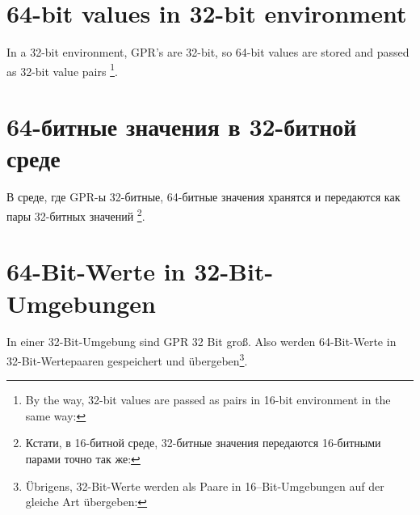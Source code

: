 \ifdefined\ENGLISH
\section{64-bit values in 32-bit environment}
\label{sec:64bit_in_32_env}

In a 32-bit environment, \ac{GPR}'s are 32-bit, so 64-bit values are stored and passed as 32-bit value pairs
\footnote{By the way, 32-bit values are passed as pairs in 16-bit environment in the same way: }.
\fi

\ifdefined\RUSSIAN
\section{64-битные значения в 32-битной среде}
\label{sec:64bit_in_32_env}

В среде, где \ac{GPR}-ы 32-битные, 64-битные значения хранятся и передаются как пары 32-битных значений
\footnote{Кстати, в 16-битной среде, 32-битные значения передаются 16-битными парами точно так же: }.
\fi

\ifdefined\GERMAN
\section{64-Bit-Werte in 32-Bit-Umgebungen}
\label{sec:64bit_in_32_env}

In einer 32-Bit-Umgebung sind \ac{GPR} 32 Bit groß. Also werden 64-Bit-Werte in
32-Bit-Wertepaaren gespeichert und übergeben\footnote{Übrigens, 32-Bit-Werte werden
als Paare in 16--Bit-Umgebungen auf der gleiche Art übergeben: }.
\fi







